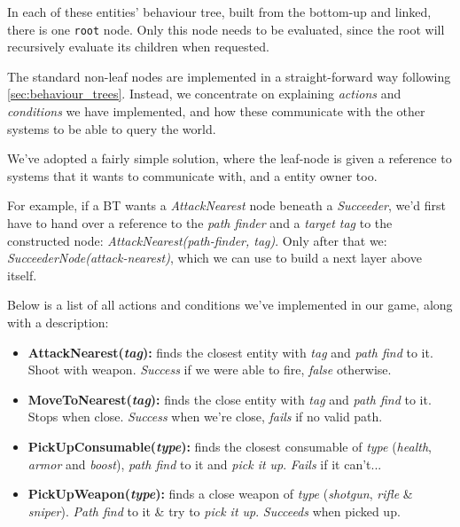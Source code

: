 \documentclass[a4paper, twocolumn]{article}
\begin{document}
        \vspace{-0.6em}

        In each of these entities' behaviour tree, built from the bottom-up and linked, there is one \texttt{root} node. Only this node needs to be evaluated, since the root will recursively evaluate its children when requested.

        The standard non-leaf nodes are implemented in a straight-forward way following \cref{sec:behaviour_trees}. Instead, we concentrate on explaining \emph{actions} and \emph{conditions} we have implemented, and how these communicate with the other systems to be able to query the world.

        We've adopted a fairly simple solution, where the leaf-node is given a reference to systems that it wants to communicate with, and a entity owner too.

        \hfill\vspace{19.4em}

        For example, if a BT wants a \emph{AttackNearest} node beneath a \emph{Succeeder}, we'd first have to hand over a reference to the \emph{path finder} and a \emph{target tag} to the constructed node: \emph{AttackNearest(path-finder, tag)}. Only after that we: \emph{SucceederNode(attack-nearest)}, which we can use to build a next layer above itself.

        Below is a list of all actions and conditions we've implemented in our game, along with a description:

        \begin{itemize}
            \item{\textbf{AttackNearest(\emph{tag}):} finds the closest entity with \emph{tag} and \emph{path find} to it. Shoot with weapon. \emph{Success} if we were able to fire, \emph{false} otherwise.}
            \item{\textbf{MoveToNearest(\emph{tag}):} finds the close entity with \emph{tag} and \emph{path find} to it. Stops when close. \emph{Success} when we're close, \emph{fails} if no valid path.}
            \item{\textbf{PickUpConsumable(\emph{type}):} finds the closest consumable of \emph{type} (\emph{health}, \emph{armor} and \emph{boost}), \emph{path find} to it and \emph{pick it up}. \emph{Fails} if it can't...}
            \item{\textbf{PickUpWeapon(\emph{type}):} finds a close weapon of \emph{type} (\emph{shotgun}, \emph{rifle} \& \emph{sniper}). \emph{Path find} to it \& try to \emph{pick it up}. \emph{Succeeds} when picked up.}
        \end{itemize}
\end{document}
